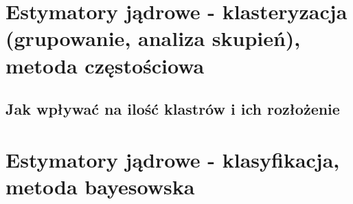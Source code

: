 \section{Estymatory jądrowe - klasteryzacja (grupowanie, analiza skupień), metoda częstościowa}
\subsection{Jak wpływać na ilość klastrów i ich rozłożenie}
\section{Estymatory jądrowe - klasyfikacja, metoda bayesowska}
